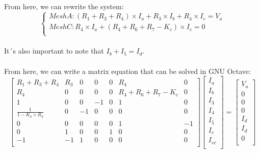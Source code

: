 \paragraph{}
From here, we can rewrite the system:
\[
\left\{\begin{matrix}
Mesh A: (R_1+R_3+R_4) \times I_a+R_3 \times I_b+R_4 \times I_c=V_a\\
Mesh C: R_4 \times I_a+(R_4+R_6+R_7-K_c) \times I_c=0\\
\end{matrix}\right.
\]

\paragraph{}
It´s also important to note that $ I_b+I_5=I_d $.

\paragraph{}
From here, we can write a matrix equation that can be solved in GNU Octave:
\[
\begin{bmatrix}
R_1+R_3+R_4 & R_3 & 0 & 0 & 0 & R_4 & 0\\
R_4 & 0 & 0 & 0 & 0 & R_4+R_6+R_7-K_c & 0\\ 
1 & 0 & 0 & -1 & 0 & 1 & 0\\
\frac{1}{1-K_b \times R_3} & 0 & -1 & 0 & 0 & 0 & 0\\
0 & 0 & 0 & 0 & 0 & 1 & -1\\
0 & 1 & 0 & 0 & 1 & 0 & 0\\ 
-1 & -1 & 1 & 0 & 0 & 0 & 0\\ 
\end{bmatrix}
\begin{bmatrix}
I_a\\
I_b\\
I_3\\
I_4\\
I_5\\
I_c\\
I_{vc}\\
\end{bmatrix}
=
\begin{bmatrix}
V_a\\
0\\
0\\
0\\
I_{d}\\
I_{d}\\
0\\
\end{bmatrix}
\]


